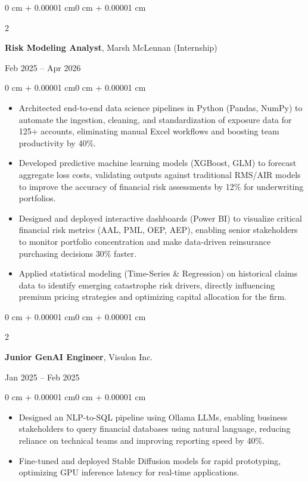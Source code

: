 \documentclass[9.5pt, letterpaper]{article}
\newenvironment{highlights}{
    \begin{itemize}[
        topsep=0pt,
        parsep=0pt,
        partopsep=0pt,
        itemsep=0pt,
        leftmargin=0 cm + 8pt
    ]
}{
    \end{itemize}
}
\newenvironment{onecolentry}{
    \begin{adjustwidth}{0 cm + 0.00001 cm}{0 cm + 0.00001 cm}
}{
    \end{adjustwidth}
}
\newenvironment{twocolentry}[2][]{
    \onecolentry
    \def\secondColumn{#2}
    \setcolumnwidth{\fill, 3.5 cm}
    \begin{paracol}{2}
}{
    \switchcolumn \raggedleft \secondColumn
    \end{paracol}
    \endonecolentry
}
\begin{document}
    \begin{twocolentry}{Feb 2025 -- Apr 2026}
        \textbf{Risk Modeling Analyst}, Marsh McLennan (Internship)
    \end{twocolentry}
    \vspace{0.01 cm}
    \begin{onecolentry}
        \begin{highlights}
            \item Architected end-to-end data science pipelines in Python (Pandas, NumPy) to automate the ingestion, cleaning, and standardization of exposure data for 125+ accounts, eliminating manual Excel workflows and boosting team productivity by 40\%.
            \item Developed predictive machine learning models (XGBoost, GLM) to forecast aggregate loss costs, validating outputs against traditional RMS/AIR models to improve the accuracy of financial risk assessments by 12\% for underwriting portfolios.
            \item Designed and deployed interactive dashboards (Power BI) to visualize critical financial risk metrics (AAL, PML, OEP, AEP), enabling senior stakeholders to monitor portfolio concentration and make data-driven reinsurance purchasing decisions 30\% faster.
            \item Applied statistical modeling (Time-Series \& Regression) on historical claims data to identify emerging catastrophe risk drivers, directly influencing premium pricing strategies and optimizing capital allocation for the firm.
        \end{highlights}
    \end{onecolentry}

    \vspace{0.01 cm}

    \begin{twocolentry}{Jan 2025 -- Feb 2025}
        \textbf{Junior GenAI Engineer}, Visulon Inc.
    \end{twocolentry}
    \vspace{0.01 cm}
    \begin{onecolentry}
        \begin{highlights}
            \item Designed an NLP-to-SQL pipeline using Ollama LLMs, enabling business stakeholders to query financial databases using natural language, reducing reliance on technical teams and improving reporting speed by 40\%.
            \item Fine-tuned and deployed Stable Diffusion models for rapid prototyping, optimizing GPU inference latency for real-time applications.
        \end{highlights}
    \end{onecolentry}
\end{document}
